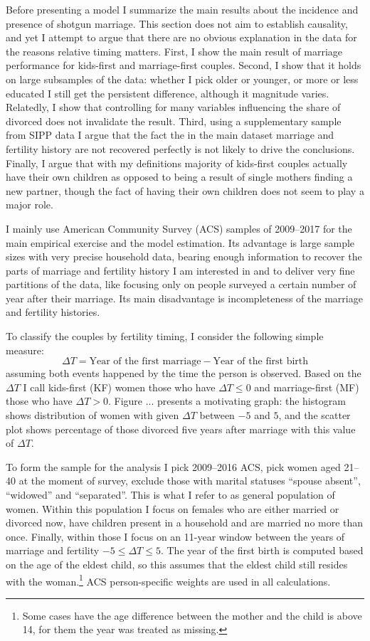 \documentclass[12pt,letter]{article}
\begin{document}
Before presenting a model I summarize the main results about the incidence and presence of shotgun marriage. This section does not aim to establish causality, and yet I attempt to argue that there are no obvious explanation in the data for the reasons relative timing matters. First, I show the main result of marriage performance for kids-first and marriage-first couples. Second, I show that it holds on large subsamples of the data: whether I pick older or younger, or more or less educated I still get the persistent difference, although it magnitude varies. Relatedly, I show that controlling for many variables influencing the share of divorced does not invalidate the result. Third, using a supplementary sample from SIPP data I argue that the fact the in the main dataset marriage and fertility history are not recovered perfectly is not likely to drive the conclusions. Finally, I argue that with my definitions majority of kids-first couples actually have their own children as opposed to being a result of single mothers finding a new partner, though the fact of having their own children does not seem to play a major role.

I mainly use American Community Survey (ACS) samples of 2009--2017 for the main empirical exercise and the model estimation. Its advantage is large sample sizes with very precise household data, bearing enough information to recover the parts of marriage and fertility history I am interested in and to deliver very fine partitions of the data, like focusing only on people surveyed a certain number of year after their marriage. Its main disadvantage is incompleteness of the marriage and fertility histories. 

To classify the couples by fertility timing, I consider the following simple measure:
\begin{equation}
\Delta T = \text{Year of the first marriage} -  \text{Year of the first birth}
\end{equation}
assuming both events happened by the time the person is observed. Based on the $\Delta T$ I call kids-first (KF) women those who have $\Delta T \leq 0$ and marriage-first (MF) those who have $\Delta T > 0$. Figure ... presents a motivating graph: the histogram shows distribution of women with given $\Delta T$ between $-5$ and $5$, and the scatter plot shows percentage of those divorced five years after marriage with this value of $\Delta T$.

To form the sample for the analysis I pick 2009--2016 ACS, pick women aged 21--40 at the moment of survey, exclude those with marital statuses ``spouse absent'', ``widowed'' and ``separated''. This is what I refer to as general population of women. Within this population I focus on females who are either married or divorced now, have children present in a household and are married no more than once. Finally, within those I focus on an 11-year window between the years of marriage and fertility $-5 \leq \Delta T \leq 5$.  The year of the first birth is computed based on the age of the eldest child, so this assumes that the eldest child still resides with the woman.\footnote{Some cases have the age difference between the mother and the child is above 14, for them the year was treated as missing.} ACS person-specific weights are used in all calculations.
\end{document}
